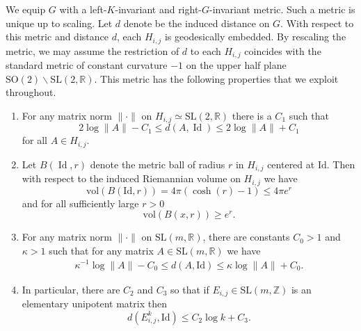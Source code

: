 \documentclass[10pt,reqno]{amsart}
\theoremstyle{Theorem}
\theoremstyle{definition}
\theoremstyle{remark}
\newcommand{\note}[1]{\marginpar{{\color{red}\footnotesize \begin{spacing}{1}#1\end{spacing}}}}
\DeclareMathOperator{\Id}{Id}
\newcommand{\R}{\mathbb {R}}
\newcommand{\Z}{\mathbb {Z}}
\newcommand{\Sl}{\mathrm{SL}}
\newcommand{\So}{\mathrm{SO}}
\newcommand{\inv}{^{-1}}
\newcommand{\id}{\mathrm{Id}}
\def\red{\color{red}}
\def\blue{}
\begin{document}
We equip $G$  with a  left-$K$-invariant and  right-$G$-invariant metric.  Such a metric is unique up to scaling.  Let $d$ denote be the induced distance on $G$.
With respect to this metric and distance $d$, each $H_{i,j}$ is geodesically embedded.  By rescaling the metric, %
  we may assume the restriction of $d$ to each $H_{i,j}$ {\blue coincides with the standard metric of constant curvature $-1$ on the upper half plane $\So(2)\backslash \Sl(2,\R)$.}
This metric has the following properties that we exploit throughout.
\begin{enumerate}
\item  For any matrix norm $\|\cdot \|$ on $H_{i,j}\simeq \Sl(2,\R)$  there is a $C_1$ such that
\begin{equation}\label{normdistance}  {2}\log \|A\| - C_1 \leq d(A, \Id) \leq    {2}\log \|A\| + C_1\end{equation}
 for all $A\in H_{i,j}$.
 \item   Let $B(\Id,r)$ denote the metric ball of radius $r$  in   $H_{i,j}$ centered at $\id$.  Then with respect to the induced Riemannian  volume on $H_{i,j}$ we have $$\mathrm{vol}(B(\id,r))= 4\pi (\cosh(r) -1)\le 4\pi e^r$$
and for all sufficiently large $r>0$
\begin{equation}\label{decapitationOrImpeachment?}
\mathrm{vol}(B(x,r))\ge e^r.
\end{equation}
\item For any matrix norm $\|\cdot \|$ on $\Sl(m,\R)$, there are constants $C_0>1$ and $\kappa>1$ such that for any matrix $A\in \Sl(m,\R)$ we have %
    \begin{equation}\label{eq:easy} \begin{gathered}
\kappa\inv\log \|A\| -  C_0
 \le d(A,\id) \le \kappa \log \|A\| +  C_0.
%
%
\end{gathered}
\end{equation}
\item In particular, there are $C_2$ and $C_3$ so that if $E_{i,j}\in \Sl(m,\Z)$ is an elementary unipotent matrix  then
\begin{equation}\label{unipotentgrowth}d(E_{i,j}^k,\id) \le C_2 \log  k + C_3.\end{equation}  %
\end{enumerate}
\end{document}
